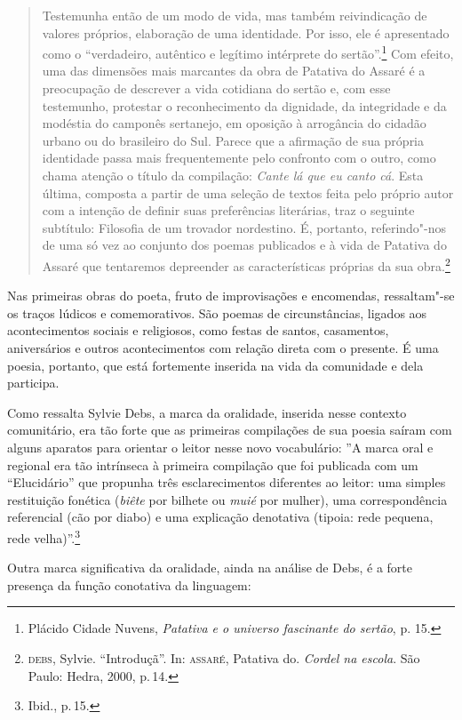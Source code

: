 \documentclass[11pt]{extarticle}
\begin{document}
\begin{quote}
Testemunha então de um modo de vida, mas também reivindicação de valores
próprios, elaboração de uma identidade. Por isso, ele é apresentado como o
“verdadeiro, autêntico e legítimo intérprete do sertão”.\footnote{ Plácido Cidade
Nuvens, \textit{Patativa e o universo fascinante do sertão}, p. 15.} Com
efeito, uma das dimensões mais marcantes da obra de Patativa do Assaré é a
preocupação de descrever a vida cotidiana do sertão e, com esse testemunho,
protestar o reconhecimento da dignidade, da integridade e da modéstia do
camponês sertanejo, em oposição à arrogância do cidadão urbano ou do brasileiro
do Sul. Parece que a afirmação de sua própria identidade passa mais
frequentemente pelo confronto com o outro, como chama atenção o título da
compilação: \textit{Cante lá que eu canto cá}. Esta última, composta a partir de uma
seleção de textos feita pelo próprio autor com a intenção de definir suas
preferências literárias, traz o seguinte subtítulo: Filosofia de um trovador
nordestino. É, portanto, referindo"-nos de uma só vez ao conjunto dos poemas
publicados e à vida de Patativa do Assaré que tentaremos depreender as
características próprias da sua obra.\footnote{\textsc{debs}, Sylvie. ``Introduçã''. In: \textsc{assaré}, Patativa do. \textit{Cordel na escola}. São Paulo: Hedra, 2000, p.\,14.}
\end{quote}

Nas primeiras obras do poeta, fruto de improvisações e encomendas, ressaltam"-se os traços lúdicos e comemorativos. São poemas de circunstâncias, ligados aos acontecimentos sociais e religiosos, como festas de santos, casamentos, aniversários e outros acontecimentos com relação direta com o presente.
É uma poesia, portanto, que está fortemente inserida na vida da comunidade e dela participa.

Como ressalta Sylvie Debs, a marca da oralidade, inserida nesse contexto comunitário, era tão forte que as primeiras compilações de sua poesia saíram com alguns aparatos para orientar o leitor nesse novo vocabulário: ''A marca oral e regional era tão intrínseca à primeira compilação que foi
publicada com um “Elucidário” que propunha três esclarecimentos diferentes ao
leitor: uma simples restituição fonética (\textit{biête} por bilhete ou \textit{muié} por mulher), uma correspondência referencial (cão por diabo) e uma explicação denotativa (tipoia: rede pequena, rede velha)''.\footnote{Ibid., p.\,15.}

Outra marca significativa da oralidade, ainda na análise de Debs, é a forte presença da função conotativa da linguagem:
\end{document}
